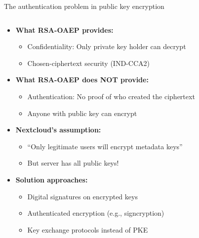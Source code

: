 \documentclass[aspectratio=169, lualatex, handout]{beamer}
\begin{document}
\begin{frame}{The authentication problem in public key encryption}
	\begin{columns}[c]
		\begin{column}{1\textwidth}
			\begin{itemize}
				\item \textbf{What RSA-OAEP provides:}
				      \begin{itemize}
					      \item Confidentiality: Only private key holder can decrypt
					      \item Chosen-ciphertext security (IND-CCA2)
				      \end{itemize}
				\item \textbf{What RSA-OAEP does NOT provide:}
				      \begin{itemize}
					      \item Authentication: No proof of who created the ciphertext
					      \item Anyone with public key can encrypt
				      \end{itemize}
				\item \textbf{Nextcloud's assumption:}
				      \begin{itemize}
					      \item ``Only legitimate users will encrypt metadata keys''
					      \item But server has all public keys!
				      \end{itemize}
				\item \textbf{Solution approaches:}
				      \begin{itemize}
					      \item Digital signatures on encrypted keys
					      \item Authenticated encryption (e.g., signcryption)
					      \item Key exchange protocols instead of PKE
				      \end{itemize}
			\end{itemize}
		\end{column}
	\end{columns}
\end{frame}
\end{document}
